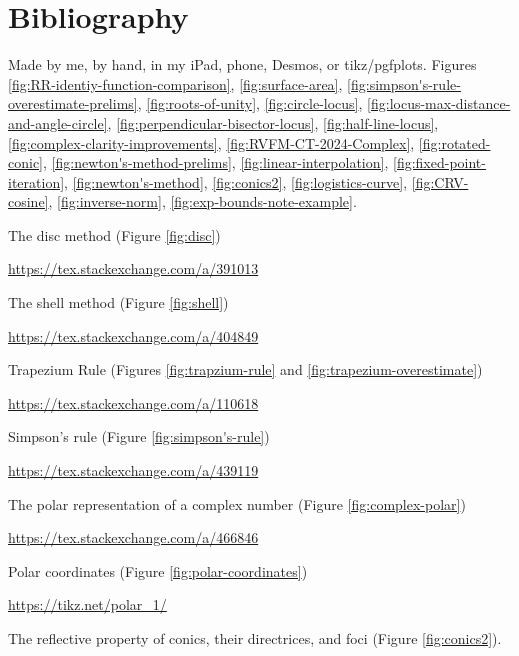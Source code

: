\documentclass[oneside]{book}
\begin{document}
\chapter{Bibliography}
\begin{enumerate}[label={[\arabic*]}]
  \item\label{Me} Made by me, by hand, in my iPad, phone, Desmos, or tikz/pgfplots. Figures 
  \ref{fig:RR-identiy-function-comparison}, 
  \ref{fig:surface-area}, 
  \ref{fig:simpson's-rule-overestimate-prelims}, 
  \ref{fig:roots-of-unity}, 
  \ref{fig:circle-locus}, 
  \ref{fig:locus-max-distance-and-angle-circle}, 
  \ref{fig:perpendicular-bisector-locus}, 
  \ref{fig:half-line-locus}, 
  \ref{fig:complex-clarity-improvements}, 
  \ref{fig:RVFM-CT-2024-Complex}, 
  \ref{fig:rotated-conic}, 
  \ref{fig:newton's-method-prelims}, 
  \ref{fig:linear-interpolation}, 
  \ref{fig:fixed-point-iteration}, 
  \ref{fig:newton's-method}, 
  \ref{fig:conics2},
  \ref{fig:logistics-curve},
  \ref{fig:CRV-cosine},
  \ref{fig:inverse-norm},
  \ref{fig:exp-bounds-note-example}.
  \item\label{source:disc} The disc method (Figure \ref{fig:disc}) 
  
  \url{https://tex.stackexchange.com/a/391013}
  \item\label{source:shell} The shell method (Figure \ref{fig:shell}) 
  
  \url{https://tex.stackexchange.com/a/404849}
  \item\label{source:trapzium-rule} Trapezium Rule (Figures \ref{fig:trapzium-rule} and \ref{fig:trapezium-overestimate}) 

  \url{https://tex.stackexchange.com/a/110618}
  \item\label{source:simpson's-rule} Simpson's rule (Figure \ref{fig:simpson's-rule}) 
  
  \url{https://tex.stackexchange.com/a/439119}
  \item\label{source:complex-polar} The polar representation of a complex number (Figure \ref{fig:complex-polar}) 
  
  \url{https://tex.stackexchange.com/a/466846}
  \item\label{source:polar-coordinates} Polar coordinates (Figure \ref{fig:polar-coordinates})
  
  \url{https://tikz.net/polar_1/}
  \item\label{source:conics2} The reflective property of conics, their directrices, and foci (Figure \ref{fig:conics2}). 
  

\end{enumerate}
\end{document}
